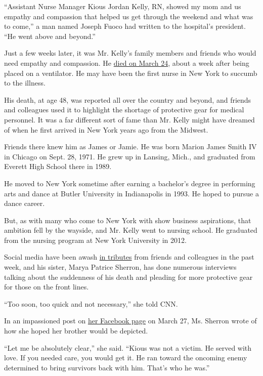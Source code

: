``Assistant Nurse Manager Kious Jordan Kelly, RN, showed my mom and us
empathy and compassion that helped us get through the weekend and what
was to come,'' a man named Joseph Fuoco had written to the hospital's
president. ``He went above and beyond.''

Just a few weeks later, it was Mr. Kelly's family members and friends
who would need empathy and compassion. He
\href{https://www.nytimes.com/2020/03/26/nyregion/nurse-dies-coronavirus-mount-sinai.html}{died
on March 24}, about a week after being placed on a ventilator. He may
have been the first nurse in New York to succumb to the illness.

His death, at age 48, was reported all over the country and beyond, and
friends and colleagues used it to highlight the shortage of protective
gear for medical personnel. It was a far different sort of fame than Mr.
Kelly might have dreamed of when he first arrived in New York years ago
from the Midwest.

Friends there knew him as James or Jamie. He was born Marion James Smith
IV in Chicago on Sept. 28, 1971. He grew up in Lansing, Mich., and
graduated from Everett High School there in 1989.

He moved to New York sometime after earning a bachelor's degree in
performing arts and dance at Butler University in Indianapolis in 1993.
He hoped to pursue a dance career.

But, as with many who come to New York with show business aspirations,
that ambition fell by the wayside, and Mr. Kelly went to nursing school.
He graduated from the nursing program at New York University in 2012.

Social media have been awash
\href{https://www.gofundme.com/f/covid19-nurse-hero-kious-kelly?utm_source=facebook\&fbclid=IwAR2HNJ9SiMmX2GmmmH72O4TU9l0x0DHVVdO_N9QJrCf2b1aTIdlwArcH3X0}{in
tributes} from friends and colleagues in the past week, and his sister,
Marya Patrice Sherron, has done numerous interviews talking about the
suddenness of his death and pleading for more protective gear for those
on the front lines.

``Too soon, too quick and not necessary,'' she told CNN.

In an impassioned post on
\href{https://www.facebook.com/marya.patrice.5}{her Facebook page} on
March 27, Ms. Sherron wrote of how she hoped her brother would be
depicted.

``Let me be absolutely clear,'' she said. ``Kious was not a victim. He
served with love. If you needed care, you would get it. He ran toward
the oncoming enemy determined to bring survivors back with him. That's
who he was.''

